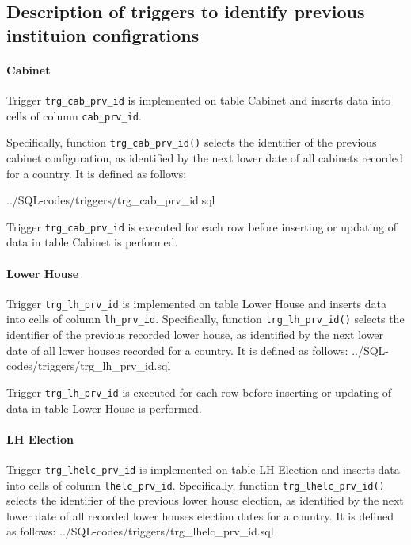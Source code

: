\subsection{Description of triggers to identify previous instituion configrations}\label{subsec_appx_trg_prv_ids}

\paragraph{Cabinet}\label{trg_cab_prv_id}
Trigger \texttt{trg\_cab\_prv\_id} is implemented on table Cabinet and inserts data into cells of column \texttt{cab\_prv\_id}. 

Specifically, function \texttt{trg\_cab\_prv\_id()} selects the identifier of the previous cabinet configuration, as identified by the next lower date of all cabinets recorded for a country.
It is defined as follows:

%
{../SQL-codes/triggers/trg_cab_prv_id.sql}

Trigger \texttt{trg\_cab\_prv\_id} is executed for each row before inserting or updating of data in table Cabinet is performed. 

\paragraph{Lower House}\label{trg_lh_prv_id}
Trigger \texttt{trg\_lh\_prv\_id} is implemented on table Lower House and inserts data into cells of column \texttt{lh\_prv\_id}. 
Specifically, function \texttt{trg\_lh\_prv\_id()} selects the identifier of the previous recorded lower house, as identified by the next lower date of all lower houses recorded for a country.
It is defined as follows:
%
{../SQL-codes/triggers/trg_lh_prv_id.sql}

Trigger \texttt{trg\_lh\_prv\_id} is executed for each row before inserting or updating of data in table Lower House is performed. 


\paragraph{LH Election}\label{trg_lhelc_prv_id}
Trigger \texttt{trg\_lhelc\_prv\_id} is implemented on table LH Election and inserts data into cells of column \texttt{lhelc\_prv\_id}. 
Specifically, function \texttt{trg\_lhelc\_prv\_id()} selects the identifier of the previous lower house election, as identified by the next lower date of all recorded lower houses election dates for a country.
It is defined as follows:
%
{../SQL-codes/triggers/trg_lhelc_prv_id.sql}

